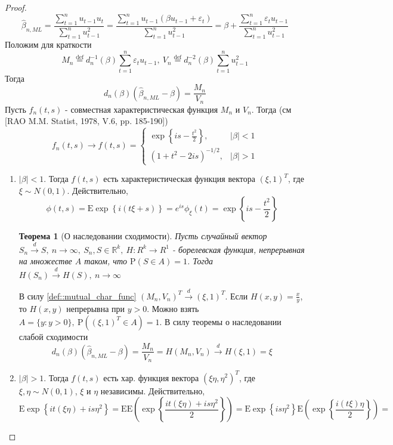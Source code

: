 \documentclass[12pt]{article}
\theoremstyle{basic_theorem}
\newtheorem*{theorem*}{Теорема}
\newcommand*{\defeq}{\stackrel{\text{def}}{=}}
\def\eps{ \varepsilon }
\def\R{ \mathbb{R} }
\def\E{ \mathrm{E} }
\def\P{ \mathrm{P} }
\begin{document}
\begin{proof}
    \[\widehat{\beta}_{n,ML}=\frac{\sum_{t=1}^nu_{t-1}u_t}{\sum_{t=1}^nu_{t-1}^2}=\frac{\sum_{t=1}^nu_{t-1}(\beta u_{t-1}+\eps_t)}{\sum_{t=1}^nu_{t-1}^2}=\beta+\frac{\sum_{t=1}^n\eps_tu_{t-1}}{\sum_{t=1}^nu_{t-1}^2}\]
    Положим для краткости
    \[M_n\defeq d^{-1}_n(\beta)\sum_{t=1}^n\eps_tu_{t-1},\ V_n\defeq d^{-2}_n(\beta)\sum_{t=1}^nu^2_{t-1}\]
    Тогда 
    \[d_n(\beta)(\widehat{\beta}_{n,ML}-\beta)=\frac{M_n}{V_n}\]
    Пусть $f_n(t,s)$ - совместная характеристическая функция $M_n$ и $V_n$.
    Тогда (см [RAO M.M. Statist, 1978, V.6, pp. 185-190])
    \begin{equation}\label{def::mutual_char_func}
        f_n(t,s)\rightarrow f(t,s)=\begin{cases}
            \exp{\left\{is-\frac{t^2}{2}\right\}},& |\beta|<1 \\
            (1+t^2-2is)^{-1/2},& |\beta|>1
        \end{cases}
    \end{equation}
    \begin{enumerate}
        \item \underline{$|\beta|<1$}. Тогда $f(t,s)$ есть характеристическая
        функция вектора $(\xi,1)^T$, где $\xi\sim N(0,1)$. Действительно,
        \[\phi(t,s)=\E\exp{\left\{i(t\xi+s)\right\}}=e^{is}\phi_\xi(t)=\exp{\left\{is-\frac{t^2}{2}\right\}}\]
        \begin{theorem*}[О наследовании сходимости]
            Пусть случайный вектор $S_n\xrightarrow{d}S,\ n\rightarrow\infty,\ S_n,S\in\R^k,\ H:R^k\rightarrow R^1$ - 
            борелевская функция, непрерывная на множестве $A$ таком, что $\P(S\in A)=1$. Тогда $H(S_n)\xrightarrow{d}H(S),\ n\rightarrow\infty$
        \end{theorem*}
        В силу \eqref{def::mutual_char_func} $(M_n,V_n)^T\xrightarrow{d}(\xi,1)^T$.
        Если $H(x,y)=\frac{x}{y}$, то $H(x,y)$  непрерывна при $y>0$.  Можно взять
        $A=\{y:y>0\},\ \P((\xi,1)^T\in A)=1$. В силу теоремы о наследовании
        слабой сходимости
        \[d_n(\beta)(\widehat{\beta}_{n,ML}-\beta)=\frac{M_n}{V_n}=H(M_n, V_n)\xrightarrow{d}H(\xi,1)=\xi\] 
        \item \underline{$|\beta|>1$}. Тогда $f(t,s)$ есть хар. функция 
        вектора $(\xi\eta,\eta^2)^T$, где $\xi,\eta\sim N(0,1)$, $\xi$ и $\eta$
        независимы. Действительно,
        \[\E\exp{\left\{it(\xi\eta)+is\eta^2\right\}}=\E\E\left(\exp{\left\{\frac{it(\xi\eta)+is\eta^2}{2}\right\}}\right)=\E\exp{\left\{is\eta^2\right\}}\E\left(\exp{\left\{\frac{i(t\xi)\eta}{2}\right\}}\right)=\]

\end{enumerate}
\end{proof}
\end{document}
